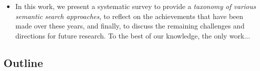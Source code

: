 \begin{itemize}
	\item In this work, we present a systematic survey to provide a \emph{taxonomy of various semantic search approaches}, to reflect on the achievements that have been made over these years, and finally, to discuss the remaining challenges and directions for future research. To the best of our knowledge, the only work... 
 
\end{itemize}


\subsection{Outline}
